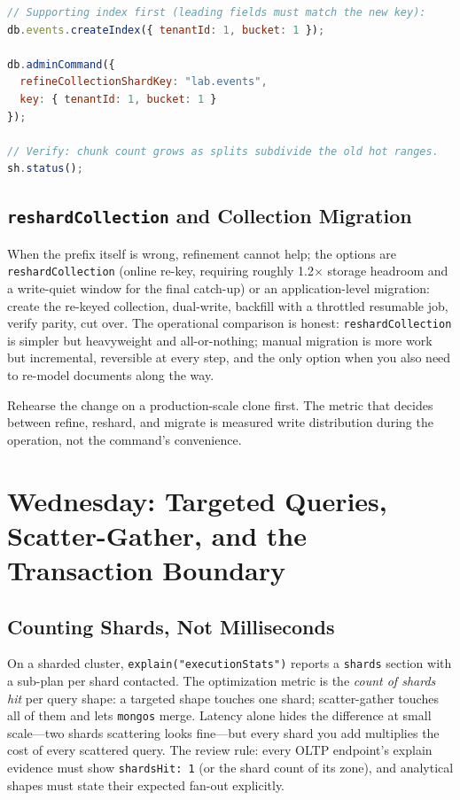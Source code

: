 \begin{lstlisting}[language=JavaScript, caption={Live refinement: adding a suffix to break a hot chunk.}]
// Supporting index first (leading fields must match the new key):
db.events.createIndex({ tenantId: 1, bucket: 1 });

db.adminCommand({
  refineCollectionShardKey: "lab.events",
  key: { tenantId: 1, bucket: 1 }
});

// Verify: chunk count grows as splits subdivide the old hot ranges.
sh.status();
\end{lstlisting}

\subsection{\texttt{reshardCollection} and Collection Migration}
When the prefix itself is wrong, refinement cannot help; the options are \texttt{reshardCollection} (online re-key, requiring roughly 1.2$\times$ storage headroom and a write-quiet window for the final catch-up) or an application-level migration: create the re-keyed collection, dual-write, backfill with a throttled resumable job, verify parity, cut over. The operational comparison is honest: \texttt{reshardCollection} is simpler but heavyweight and all-or-nothing; manual migration is more work but incremental, reversible at every step, and the only option when you also need to re-model documents along the way.

\begin{tipbox}
Rehearse the change on a production-scale clone first. The metric that decides between refine, reshard, and migrate is measured write distribution during the operation, not the command's convenience.
\end{tipbox}

\section{Wednesday: Targeted Queries, Scatter-Gather, and the Transaction Boundary}
\subsection{Counting Shards, Not Milliseconds}
On a sharded cluster, \texttt{explain("executionStats")} reports a \texttt{shards} section with a sub-plan per shard contacted. The optimization metric is the \emph{count of shards hit} per query shape: a targeted shape touches one shard; scatter-gather touches all of them and lets \texttt{mongos} merge. Latency alone hides the difference at small scale---two shards scattering looks fine---but every shard you add multiplies the cost of every scattered query. The review rule: every OLTP endpoint's explain evidence must show \texttt{shardsHit: 1} (or the shard count of its zone), and analytical shapes must state their expected fan-out explicitly.

